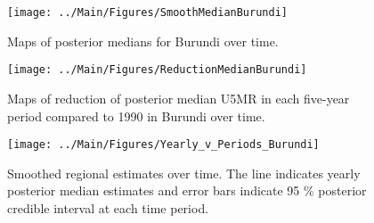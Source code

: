 \documentclass[12pt]{article}\usepackage[]{graphicx}\usepackage[]{color}
\newenvironment{knitrout}{}{} %
\begin{document}
\begin{knitrout}
\color{fgcolor}\begin{figure}[bht]

{\centering \texttt{[image: ../Main/Figures/SmoothMedianBurundi]} 

}

\caption[Maps of posterior medians for Burundi  over time]{Maps of posterior medians for Burundi  over time.}\label{fig:unnamed-chunk-34}
\end{figure}


\end{knitrout}
\begin{knitrout}
\color{fgcolor}\begin{figure}[bht]

{\centering \texttt{[image: ../Main/Figures/ReductionMedianBurundi]} 

}

\caption[Maps of reduction of posterior median U5MR in each five-year period compared to 1990 in Burundi over time]{Maps of reduction of posterior median U5MR in each five-year period compared to 1990 in Burundi over time.}\label{fig:unnamed-chunk-35}
\end{figure}


\end{knitrout}
\begin{knitrout}
\color{fgcolor}\begin{figure}[bht]

{\centering \texttt{[image: ../Main/Figures/Yearly\_v\_Periods\_Burundi]} 

}

\caption[Smoothed regional estimates over time]{Smoothed regional estimates over time. The line indicates yearly posterior median estimates and error bars indicate 95 \% posterior credible interval at each time period.}\label{fig:unnamed-chunk-36}
\end{figure}


\end{knitrout}
\end{document}
